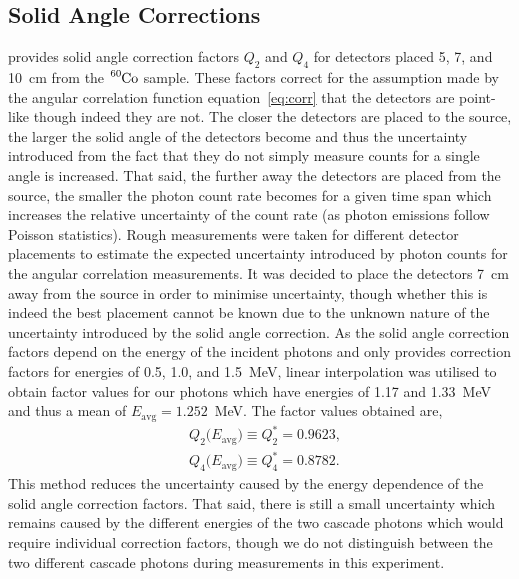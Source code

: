 \documentclass[twocolumn]{article}
\begin{document}
\subsection{Solid Angle Corrections}
\cite{sieg} provides solid angle correction factors $Q_2$ and $Q_4$ for detectors placed 5, 7, and 10~cm from the $\ce{^{60}Co}$ sample. These factors correct for the assumption made by the angular correlation function equation~\ref{eq:corr} that the detectors are point-like though indeed they are not. The closer the detectors are placed to the source, the larger the solid angle of the detectors become and thus the uncertainty introduced from the fact that they do not simply measure counts for a single angle is increased. That said, the further away the detectors are placed from the source, the smaller the photon count rate becomes for a given time span which increases the relative uncertainty of the count rate (as photon emissions follow Poisson statistics). Rough measurements were taken for different detector placements to estimate the expected uncertainty introduced by photon counts for the angular correlation measurements. It was decided to place the detectors 7~cm away from the source in order to minimise uncertainty, though whether this is indeed the best placement cannot be known due to the unknown nature of the uncertainty introduced by the solid angle correction. As the solid angle correction factors depend on the energy of the incident photons and \cite{sieg} only provides correction factors for energies of 0.5, 1.0, and 1.5~MeV, linear interpolation was utilised to obtain factor values for our photons which have energies of 1.17 and 1.33~MeV and thus a mean of $E_{\text{avg}} = 1.252$~MeV. The factor values obtained are,
\begin{align*}
&Q_2\big(E_{\text{avg}}\big) \equiv Q^*_2 = 0.9623,\\
&Q_4\big(E_{\text{avg}}\big) \equiv Q^*_4 = 0.8782.
\end{align*}
This method reduces the uncertainty caused by the energy dependence of the solid angle correction factors. That said, there is still a small uncertainty which remains caused by the different energies of the two cascade photons which would require individual correction factors, though we do not distinguish between the two different cascade photons during measurements in this experiment.
\end{document}
